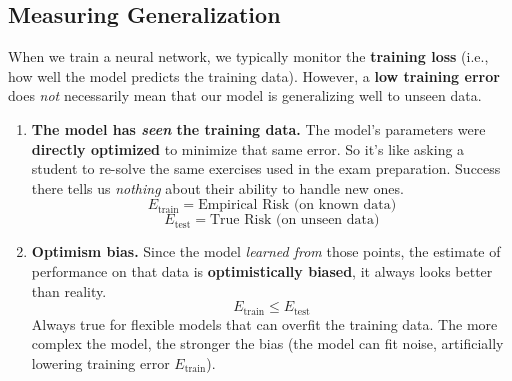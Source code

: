 \subsection{Measuring Generalization}

When we train a neural network, we typically monitor the \textbf{training loss} (i.e., how well the model predicts the training data). However, a \textbf{low training error} does \emph{not} necessarily mean that our model is generalizing well to unseen data.
\begin{enumerate}
    \item[\textcolor{Red2}{\faIcon{exclamation-triangle}}] \textcolor{Red2}{\textbf{The model has \emph{seen} the training data.}} The model's parameters were \textbf{directly optimized} to minimize that same error. So it's like asking a student to re-solve the same exercises used in the exam preparation. Success there tells us \emph{nothing} about their ability to handle new ones.
    \begin{equation*}
        E_{\text{train}} = \text{Empirical Risk (on known data)}
    \end{equation*}
    \begin{equation*}
        E_{\text{test}} = \text{True Risk (on unseen data)}
    \end{equation*}

    \item[\textcolor{Red2}{\faIcon{exclamation-triangle}}] \textcolor{Red2}{\textbf{Optimism bias.}} Since the model \emph{learned from} those points, the estimate of performance on that data is \textbf{optimistically biased}, it always looks better than reality.
    \begin{equation*}
        E_{\text{train}} \leq E_{\text{test}}
    \end{equation*}
    Always true for flexible models that can overfit the training data. The more complex the model, the stronger the bias (the model can fit noise, artificially lowering training error $E_{\text{train}}$).
    

\end{enumerate}
